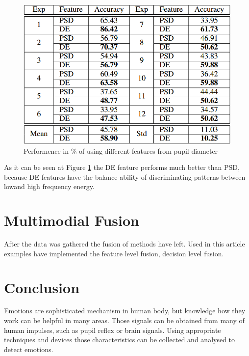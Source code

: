 \documentclass[10pt,journal,compsoc,twoside]{IEEEtran}
\newcommand{\Ref}[2]{#2 \ref{#1}}
\begin{document}
\begin{figure}[ht]
	\centering
	\includegraphics[width=1.0\linewidth]{performanceOfClassifierPupil1}
	\caption{ Performence in \% of using different features from pupil diameter \cite{WeiLongBoNanBaoLiang2014}}
	\label{fig:performanceOfClassifierPupil1}
\end{figure}
As it can be seen at \Ref{fig:performanceOfClassifierPupil1}{Figure} the DE feature performs much better than PSD, because DE features have the balance ability of discriminating patterns between  lowand high frequency energy.
 \section{Multimodial Fusion} 
After the data was gathered the fusion of methods have left. Used in this article examples have implemented the feature level fusion, decision level fusion. 
\section{Conclusion}

Emotions are sophisticated mechanism in human body, but knowledge how they work can be helpful in many areas. Those signals can be obtained from many of human impulses, such as pupil reflex or brain signals. Using appropriate techniques and devices those characteristics can be collected and analysed to detect emotions.
	
\end{document}
